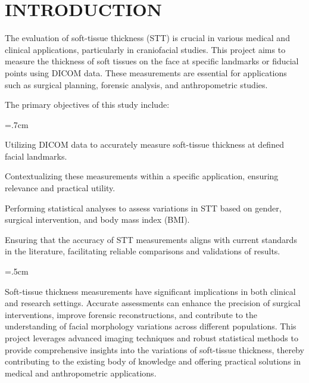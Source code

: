 \documentclass{article_saj}
\begin{document}
\tenrm


\section{INTRODUCTION}

\indent

The evaluation of soft-tissue thickness (STT) is crucial in various medical and clinical applications, particularly in craniofacial studies. This project aims to measure the thickness of soft tissues on the face at specific landmarks or fiducial points using DICOM data. These measurements are essential for applications such as surgical planning, forensic analysis, and anthropometric studies.

\renewcommand{\thefootnote}{\arabic{footnote}}

The primary objectives of this study include:

\parindent=.7cm

\par\hang{} Utilizing DICOM data to accurately measure soft-tissue thickness at defined facial landmarks.

\par\hang{} Contextualizing these measurements within a specific application, ensuring relevance and practical utility.

\par\hang{} Performing statistical analyses to assess variations in STT based on gender, surgical intervention, and body mass index (BMI).

\par\hang{} Ensuring that the accuracy of STT measurements aligns with current standards in the literature, facilitating reliable comparisons and validations of results.

\parindent=.5cm

Soft-tissue thickness measurements have significant implications in both clinical and research settings. Accurate assessments can enhance the precision of surgical interventions, improve forensic reconstructions, and contribute to the understanding of facial morphology variations across different populations. This project leverages advanced imaging techniques and robust statistical methods to provide comprehensive insights into the variations of soft-tissue thickness, thereby contributing to the existing body of knowledge and offering practical solutions in medical and anthropometric applications.
\end{document}
